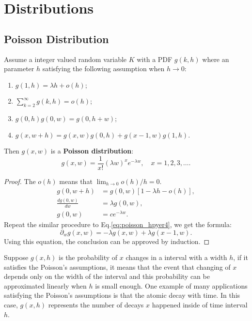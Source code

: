 
\section{Distributions}

\subsection{Poisson Distribution}
\begin{definition}
Assume a integer valued random variable $K$ with a PDF $g(k,h)$ where an parameter $h$ satisfying the following assumption when $h\to 0$:
\begin{enumerate}
\item $g(1,h) = \lambda h+o(h)$;
\item $\sum_{k=2}^{\infty}g(k,h)=o(h)$;
\item $g(0,h)g(0,w)=g(0,h+w)$;\label{eq:poisson_hpyer3}
\item $g(x,w+h)=g(x,w)g(0,h)+g(x-1,w)g(1,h)$.\label{eq:poisson_hpyer4}
\end{enumerate}
Then $g(x,w)$ is a \textbf{Poisson distribution}:
\begin{equation}
g(x,w)=\frac{1}{x!}(\lambda w)^xe^{-\lambda w},\quad x=1,2,3,\dots.
\end{equation}
\end{definition}
\begin{proof}
The $o(h)$ means that $\lim_{h\to 0}o(h)/h=0$. 
\begin{equation*}
\begin{aligned}
g(0,w+h)&=g(0,w)[1-\lambda h-o(h)],\\
\frac{dg(0,w)}{dw}&=\lambda g(0,w),\\
g(0,w)&=ce^{-\lambda w}.
\end{aligned}
\end{equation*}
Repeat the similar procedure to Eq.\ref{eq:poisson_hpyer4}, we get the formula:
\begin{equation*}
\partial_wg(x,w)=-\lambda g(x,w)+\lambda g(x-1,w).
\end{equation*}
Using this equation, the conclusion can be approved by induction.
\end{proof}
Suppose $g(x,h)$ is the probability of $x$ changes in a interval with a width $h$, if it satisfies the Poisson's assumptions, it means that the event that changing of $x$ depends only on the width of the interval and this probability can be approximated linearly when $h$ is small enough. One example of many applications satisfying the Poisson's assumptions is that the atomic decay with time. In this case, $g(x,h)$ represents the number of decays $x$ happened inside of time interval $h$.

